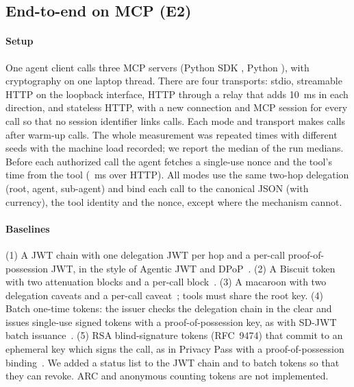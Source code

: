 \subsection{End-to-end on MCP (E2)}
\paragraph*{Setup} One agent client calls three MCP servers (Python SDK \EMcpSdk{}, Python \EPy{}), with cryptography on one laptop thread. There are four transports: stdio, streamable HTTP on the loopback interface, HTTP through a relay that adds 10~ms in each direction, and stateless HTTP, with a new connection and MCP session for every call so that no session identifier links calls.
Each mode and transport makes \ECalls{} calls after \EWarm{} warm-up calls. The whole measurement was repeated \ERuns{} times with different seeds with the machine load recorded; we report the median of the run medians. Before each authorized call the agent fetches a single-use nonce and the tool's time from the tool (\EChalHttp{}~ms over HTTP). All modes use the same two-hop delegation (root, agent, sub-agent) and bind each call to the canonical JSON (with currency), the tool identity and the nonce, except where the mechanism cannot.

\paragraph*{Baselines} (1) A JWT chain with one delegation JWT per hop and a per-call proof-of-possession JWT, in the style of Agentic JWT and DPoP~\cite{goswami2025ajwt,rfc9449}. (2) A Biscuit token with two attenuation blocks and a per-call block~\cite{prakash2026aip}. (3) A macaroon with two delegation caveats and a per-call caveat~\cite{birgisson2014macaroons}; tools must share the root key. (4) Batch one-time tokens: the issuer checks the delegation chain in the clear and issues single-use signed tokens with a proof-of-possession key, as with SD-JWT batch issuance~\cite{rfc9901}. (5) RSA blind-signature tokens (RFC~9474) that commit to an ephemeral key which signs the call, as in Privacy Pass with a proof-of-possession binding~\cite{rfc9474,rfc9578}. We added a status list to the JWT chain and to batch tokens so that they can revoke. ARC and anonymous counting tokens are not implemented.

